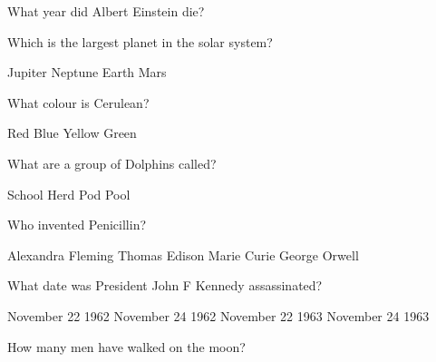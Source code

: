 \documentclass[letter]{article}
\begin{document}
\begin{mcquestions}
 
 
 
\question What year did Albert Einstein die?

          \begin{mcanswerslist}[ordinal]
          \end{mcanswerslist}



\question Which is the largest planet in the solar system?

          \begin{mcanswerslist}
          \answer[correct] Jupiter
          \answer Neptune
          \answer Earth
          \answer Mars
          \end{mcanswerslist}


\question What colour is Cerulean?

          \begin{mcanswerslist}
          \answer Red
          \answer[correct] Blue
          \answer Yellow
          \answer Green
          \end{mcanswerslist}
          
\question What are a group of Dolphins called?

          \begin{mcanswerslist}
          \answer School
          \answer Herd
          \answer[correct] Pod
          \answer Pool
          \end{mcanswerslist}

\question Who invented Penicillin?

          \begin{mcanswerslist}
          \answer[correct] Alexandra Fleming
          \answer Thomas Edison
          \answer Marie Curie
          \answer George Orwell
          \end{mcanswerslist}

\question What date was President John F Kennedy assassinated?

          \begin{mcanswerslist}[{1,2,3,4},{1,3,2,4},{4,3,2,1},{4,2,3,1}]
          \answer November 22 1962
          \answer November 24 1962
          \answer[correct] November 22 1963
          \answer November 24 1963
          
          \end{mcanswerslist}

\question How many men have walked on the moon?


\end{mcquestions}
\end{document}

